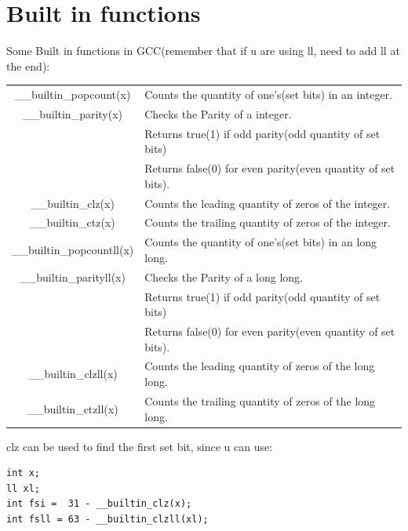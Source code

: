 
\section{Built in functions}

Some Built in functions in GCC(remember that if u are using ll, need to add ll at the end):
\begin{center}
\begin{tabular}{ c | l }
  \_\_builtin\_popcount(x)  & Counts the quantity of one’s(set bits) in an integer.  \\ 
 \_\_builtin\_parity(x) & Checks the Parity of a integer.\\
 
 &Returns true(1) if odd parity(odd quantity of set bits)\\
 
 & Returns false(0) for even parity(even quantity of set bits).  \\  
 \_\_builtin\_clz(x) &  Counts the leading quantity of zeros of the integer.\\
 \_\_builtin\_ctz(x) & Counts the trailing quantity of zeros of the integer.  \\ 
 \_\_builtin\_popcountll(x)  & Counts the quantity of one’s(set bits) in an long long.  \\ 
 \_\_builtin\_parityll(x) & Checks the Parity of a long long.\\
 
 &Returns true(1) if odd parity(odd quantity of set bits)\\
 
 & Returns false(0) for even parity(even quantity of set bits).  \\   
 \_\_builtin\_clzll(x) &  Counts the leading quantity of zeros of the long long.\\
 \_\_builtin\_ctzll(x) & Counts the trailing quantity of zeros of the long long.  \\ 
\end{tabular}
\end{center}
clz can be used to find the first set bit, since u can use:
\begin{lstlisting}
int x;
ll xl;
int fsi =  31 - __builtin_clz(x);
int fsll = 63 - __builtin_clzll(xl);
\end{lstlisting}
